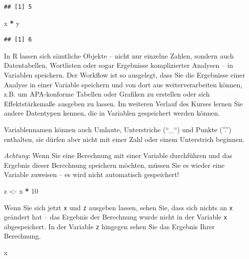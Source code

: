 \documentclass[
  ngerman,
]{book}
\newenvironment{Shaded}{\begin{snugshade}}{\end{snugshade}}
\newcommand{\DecValTok}[1]{\textcolor[rgb]{0.00,0.00,0.81}{#1}}
\newcommand{\NormalTok}[1]{#1}
\newcommand{\OtherTok}[1]{\textcolor[rgb]{0.56,0.35,0.01}{#1}}
\newcommand{\SpecialCharTok}[1]{\textcolor[rgb]{0.81,0.36,0.00}{\textbf{#1}}}
\begin{document}
\begin{verbatim}
## [1] 5
\end{verbatim}

\begin{Shaded}
\begin{Highlighting}[]
\NormalTok{x }\SpecialCharTok{*}\NormalTok{ y}
\end{Highlighting}
\end{Shaded}

\begin{verbatim}
## [1] 6
\end{verbatim}

In R lassen sich sämtliche Objekte -- nicht nur einzelne Zahlen, sondern auch Datentabellen, Wortlisten oder sogar Ergebnisse komplizierter Analysen -- in Variablen speichern. Der Workflow ist so ausgelegt, dass Sie die Ergebnisse einer Analyse in einer Variable speichern und von dort aus weiterverarbeiten können, z.B. um APA-konforme Tabellen oder Grafiken zu erstellen oder sich Effektstärkemaße ausgeben zu lassen. Im weiteren Verlauf des Kurses lernen Sie andere Datentypen kennen, die in Variablen gespeichert werden können.

Variablennamen können auch Umlaute, Unterstriche (``\_``) und Punkte (''.'') enthalten, sie dürfen aber nicht mit einer Zahl oder einem Unterstrich beginnen.

\emph{Achtung}: Wenn Sie eine Berechnung mit einer Variable durchführen und das Ergebnis dieser Berechnung speichern möchten, müssen Sie es wieder eine Variable zuweisen -- es wird nicht automatisch gespeichert!

\begin{Shaded}
\begin{Highlighting}[]
\NormalTok{z }\OtherTok{\textless{}{-}}\NormalTok{ x }\SpecialCharTok{*} \DecValTok{10}
\end{Highlighting}
\end{Shaded}

Wenn Sie sich jetzt \texttt{x} und \texttt{z} ausgeben lassen, sehen Sie, dass sich nichts an \texttt{x} geändert hat -- das Ergebnis der Berechnung wurde nicht in der Variable \texttt{x} abgespeichert. In der Variable \texttt{z} hingegen sehen Sie das Ergebnis Ihrer Berechnung.

\begin{Shaded}
\begin{Highlighting}[]
\NormalTok{x}
\end{Highlighting}
\end{Shaded}
\end{document}
